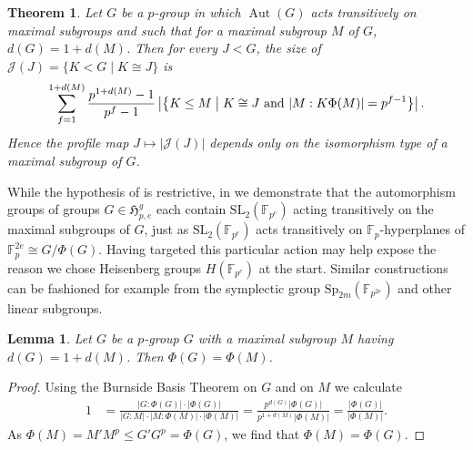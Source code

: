 \documentclass{toc}
\numberwithin{equation}{section}
\theoremstyle{plain}       %
\newtheorem{thm}[equation]{Theorem}
\newtheorem{lem}[equation]{Lemma}
\theoremstyle{remark}
\theoremstyle{definition}
\numberwithin{figure}{section}
\numberwithin{table}{section}
\newcommand{\mygroups}{\mathfrak{H}}
\newcommand{\bbF}{\mathbb{F}}  %
\DeclareMathOperator{\Aut}{Aut}  %
\begin{document}
\begin{thm}\label{thm:count}
	Let $G$ be a $p$-group in which $\Aut(G)$ acts transitively on maximal
	subgroups and such that for a maximal subgroup $M$ of $G$,\ $d(G)=1+d(M)$.
	Then for every $J<G$, the size of $\mathcal{J}(J)=\{ K< G \mid K\cong J\}$
	is
	\begin{align*}
		\sum_{f=1}^{1+d(M)} \frac{p^{1+d(M)}-1}{p^f-1} 
		\left|\left\{ K\leq M \;\middle|\;
			K\cong J\textnormal{ and }
			|M:K\Phi(M)|=p^{f-1}\right\}\right|.
	\end{align*}
	Hence the profile map $J\mapsto |\mathcal{J}(J)|$ depends only on the
	isomorphism type of a maximal subgroup of $G$.
\end{thm}

While the hypothesis of  is restrictive, in
 we demonstrate that the automorphism groups of
groups $G\in \mygroups_{p,e}^{g}$ each contain $\mathrm{SL}_2(\bbF_{p^e})$
acting transitively on the maximal subgroups of $G$, just as
$\mathrm{SL}_2(\bbF_{p^e})$ acts transitively on $\bbF_p$-hyperplanes of
$\bbF_p^{2e}\cong G/\Phi(G)$.  Having targeted this particular action may help
expose the reason we chose Heisenberg groups $H(\bbF_{p^e})$ at the start.
%
%
%
Similar constructions can be fashioned for example from the symplectic group
$\mathrm{Sp}_{2m}(\mathbb{F}_{p^{2e}})$ and other linear subgroups.
%

\begin{lem}\label{lem:Frattini}
Let $G$ be a $p$-group $G$ with a maximal subgroup $M$ having $d(G)=1+d(M)$.
Then $\Phi(G)=\Phi(M)$.
\end{lem}
\begin{proof}
Using the Burnside Basis Theorem on $G$ and on $M$ we calculate 
\begin{align*}
	1 & = \frac{|G:\Phi(G)|\cdot |\Phi(G)|}{|G:M|\cdot |M:\Phi(M)|\cdot |\Phi(M)|}
		=\frac{p^{d(G)} |\Phi(G)|}{ p^{1+d(M)} |\Phi(M)|}
		=\frac{|\Phi(G)|}{|\Phi(M)|}.
\end{align*}
As $\Phi(M)=M' M^p\leq G' G^p=\Phi(G)$, we find that $\Phi(M)=\Phi(G)$.
\end{proof}
\end{document}
